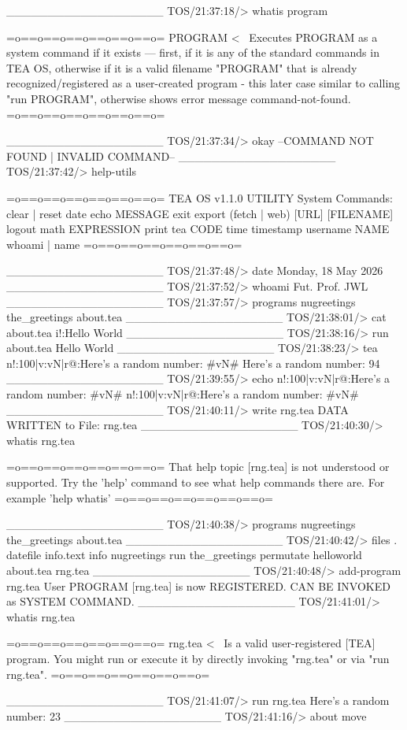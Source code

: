 \documentclass[a4paper, 18pt]{book} %
\begin{document}
{{{\begin{tcbverbatim}[title=Sample OUTPUT 1 from TEA OS v1.1.0]
___________________
TOS/21:37:18/> 
whatis program

=o==o==o==o==o==o==o=
PROGRAM <~ Executes PROGRAM as a system command if it exists --- first, if it is any of the standard commands in TEA OS, otherwise if it is a valid filename "PROGRAM" that is already recognized/registered as a user-created program - this later case similar to calling "run PROGRAM", otherwise shows error message command-not-found.
=o==o==o==o==o==o==o=

___________________
TOS/21:37:34/> 
okay
--COMMAND NOT FOUND | INVALID COMMAND--
___________________
TOS/21:37:42/> 
help-utils

=o==o==o==o==o==o==o=
TEA OS v1.1.0 UTILITY System Commands:
clear | reset
date
echo MESSAGE
exit
export
(fetch | web) [URL] [FILENAME]
logout
math EXPRESSION
print
tea CODE
time
timestamp
username NAME
whoami | name
=o==o==o==o==o==o==o=

___________________
TOS/21:37:48/> 
date
Monday, 18 May 2026
___________________
TOS/21:37:52/> 
whoami
Fut. Prof. JWL
___________________
TOS/21:37:57/> 
programs
nugreetings
the_greetings
about.tea
___________________
TOS/21:38:01/> 
cat about.tea
i!:Hello World
___________________
TOS/21:38:16/> 
run about.tea
Hello World
___________________
TOS/21:38:23/> 
tea n!:100|v:vN|r@:{Here's a random number: #vN#}
Here's a random number: 94
___________________
TOS/21:39:55/> 
echo n!:100|v:vN|r@:{Here's a random number: #vN#}
n!:100|v:vN|r@:{Here's a random number: #vN#}
___________________
TOS/21:40:11/> 
write rng.tea
DATA WRITTEN to File: rng.tea
___________________
TOS/21:40:30/> 
whatis rng.tea

=o==o==o==o==o==o==o=
That help topic [rng.tea] is not understood or supported. Try the 'help' command to see what help commands there are. For example 'help whatis'
=o==o==o==o==o==o==o=

___________________
TOS/21:40:38/> 
programs
nugreetings
the_greetings
about.tea
___________________
TOS/21:40:42/> 
files
.
datefile
info.text
info
nugreetings
run
the_greetings
permutate
helloworld
about.tea
rng.tea
___________________
TOS/21:40:48/> 
add-program rng.tea
User PROGRAM [rng.tea] is now REGISTERED.
CAN BE INVOKED as SYSTEM COMMAND.
___________________
TOS/21:41:01/> 
whatis rng.tea

=o==o==o==o==o==o==o=
rng.tea <~ Is a valid user-registered [TEA] program. You might run or execute it by directly invoking "rng.tea" or via "run rng.tea".
=o==o==o==o==o==o==o=

___________________
TOS/21:41:07/> 
run rng.tea
Here's a random number: 23
___________________
TOS/21:41:16/> 
about move


\end{tcbverbatim}}}}
\end{document}
